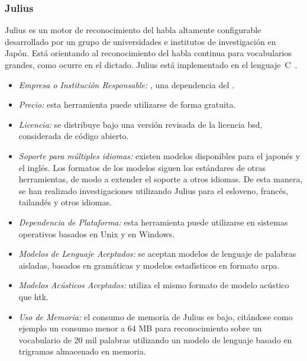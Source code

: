 \subsubsection{Julius}
\label{sec:julius}

Julius es un motor de reconocimiento del habla altamente configurable desarrollado por un grupo
de universidades e institutos de investigaci\'on en Jap\'on. Est\'a orientando al reconocimiento
del habla continua para vocabularios grandes, como ocurre en el dictado.
Julius est\'a implementado en el \mbox{lenguaje C \cite{JuliusHomePage}}.

\begin{itemize}
	\item \emph{Empresa o Instituci\'on Responsable:} ,
	una dependencia del .
	\item \emph{Precio:} esta herramienta puede utilizarse de forma gratuita.
	\item \emph{Licencia:} se distribuye bajo una versi\'on revisada de la licencia
	\gls{bsd}, considerada de c\'odigo abierto.
	\item \emph{Soporte para m\'ultiples idiomas:} existen modelos disponibles para
	el japon\'es y el ingl\'es. Los formatos de los modelos siguen los est\'andares de otras
	herramientas, de modo a extender el soporte a otros idiomas. De esta manera,
	se han realizado investigaciones utilizando Julius para el esloveno, franc\'es, tailand\'es
	y otros idiomas.
	\item \emph{Dependencia de Plataforma:} esta herramienta puede utilizarse en sistemas operativos
	basados en Unix y en Windows.
	\item \emph{Modelos de Lenguaje Aceptados:} se aceptan modelos de lenguaje de palabras aisladas,
	basados en gram\'aticas y modelos estad{\'\i}sticos en formato \gls{arpa}.
	\item \emph{Modelos Ac\'usticos Aceptados:} utiliza el mismo formato de modelo ac\'ustico que \gls{htk}.
	\item \emph{Uso de Memoria:} el consumo de memoria de Julius es bajo, cit\'andose como ejemplo
	un consumo menor a 64 MB para reconocimiento sobre un vocabulario de 20 mil palabras utilizando
	un modelo de lenguaje basado en trigramas almacenado en memoria.
\end{itemize}